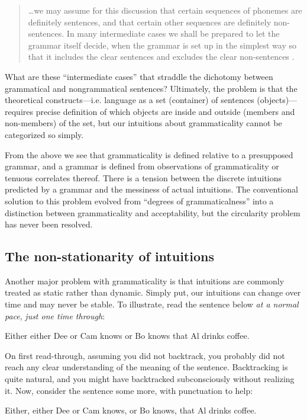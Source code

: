 \begin{quote}	
…we may assume for this discussion that certain sequences of phonemes are definitely sentences, and that certain other sequences are definitely non-sentences. In many intermediate cases we shall be prepared to let the grammar itself decide, when the grammar is set up in the simplest way so that it includes the clear sentences and excludes the clear non-sentences \citep[14]{Chomsky1957}.
\end{quote}

  What are these “intermediate cases” that straddle the dichotomy between grammatical and nongrammatical sentences? Ultimately, the problem is that the theoretical constructs—i.e. language as a set (container) of sentences (objects)—requires precise definition of which objects are inside and outside (members and non-members) of the set, but our intuitions about grammaticality cannot be categorized so simply.

  From the above we see that grammaticality is defined relative to a presupposed grammar, and a grammar is defined from observations of grammaticality or tenuous correlates thereof. There is a tension between the discrete intuitions predicted by a grammar and the messiness of actual intuitions. The conventional solution to this problem evolved from “degrees of grammaticalness” into a distinction between grammaticality and acceptability, but the circularity problem has never been resolved. 

\subsection{The non-stationarity of intuitions}

Another major problem with grammaticality is that intuitions are commonly treated as static rather than dynamic. Simply put, our intuitions can change over time and may never be stable. To illustrate, read the sentence below \textit{at a normal pace}, \textit{just one time through}:

\ea
    {Either either Dee or Cam knows or Bo knows that Al drinks coffee.}
\z    

On first read-through, assuming you did not backtrack, you probably did not reach any clear understanding of the meaning of the sentence. Backtracking is quite natural, and you might have backtracked subconsciously without realizing it. Now, consider the sentence some more, with punctuation to help:

\ea
Either, either Dee or Cam knows, or Bo knows, that Al drinks coffee.
\z

